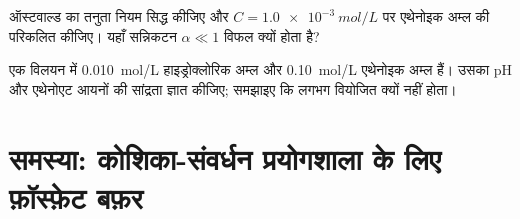 \begin{exercise}[$\star\star\star$]\label{exo:b1:predominant-reaction:11}
ऑस्टवाल्ड का तनुता नियम सिद्ध कीजिए और $C = \qty{1.0e-3}{mol/L}$ पर
एथेनोइक अम्ल की  परिकलित कीजिए। यहाँ
सन्निकटन $\alpha \ll 1$ विफल क्यों होता है?
\end{exercise}

\begin{exercise}[$\star\star\star$]\label{exo:b1:predominant-reaction:12}
एक विलयन में \qty{0.010}{mol/L} हाइड्रोक्लोरिक अम्ल और
\qty{0.10}{mol/L} एथेनोइक अम्ल हैं। उसका pH और
एथेनोएट आयनों की सांद्रता ज्ञात कीजिए; समझाइए कि  लगभग वियोजित क्यों नहीं होता।
\end{exercise}

\section{समस्या: कोशिका-संवर्धन प्रयोगशाला के लिए फ़ॉस्फ़ेट बफ़र}

